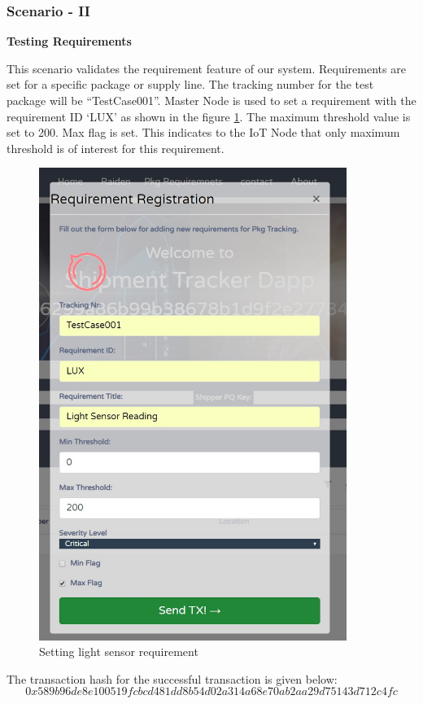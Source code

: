 \clearpage
\subsubsection{Scenario - II} \label{reqtesting} 
\textbf{Testing Requirements}

This scenario validates the requirement feature of our system. Requirements are set for a specific package or supply line. The tracking number for the test package will be “TestCase001”. Master Node is used to set a requirement with the requirement ID ‘LUX’ as shown in the figure \ref{fig:SetRequirements}. The maximum threshold value is set to 200. Max flag is set. This indicates to the IoT Node that only maximum threshold is of interest for this requirement.

\begin{figure}[!h]
	\centering
    \includegraphics[width=100mm,scale=1]{figs/SetRequirements}
	\caption{Setting light sensor requirement}
	\label{fig:SetRequirements} 
\end{figure}

The transaction hash for the successful transaction is given below:
\[0x589b96de8e100519fcbcd481dd8b54d02a314a68e70ab2aa29d75143d712c4fc\]

